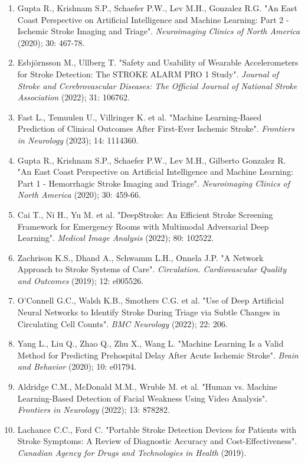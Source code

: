 {{\begin{enumerate}
    \item Gupta R., Krishnam S.P., Schaefer P.W., Lev M.H., Gonzalez R.G. "An East Coast Perspective on Artificial Intelligence and Machine Learning: Part 2 - Ischemic Stroke Imaging and Triage". \textit{Neuroimaging Clinics of North America} (2020); 30: 467-78.
    \item Esbjörnsson M., Ullberg T. "Safety and Usability of Wearable Accelerometers for Stroke Detection: The STROKE ALARM PRO 1 Study". \textit{Journal of Stroke and Cerebrovascular Diseases: The Official Journal of National Stroke Association} (2022); 31: 106762.
    \item Fast L., Temuulen U., Villringer K. et al. "Machine Learning-Based Prediction of Clinical Outcomes After First-Ever Ischemic Stroke". \textit{Frontiers in Neurology} (2023); 14: 1114360.
    \item Gupta R., Krishnam S.P., Schaefer P.W., Lev M.H., Gilberto Gonzalez R. "An East Coast Perspective on Artificial Intelligence and Machine Learning: Part 1 - Hemorrhagic Stroke Imaging and Triage". \textit{Neuroimaging Clinics of North America} (2020); 30: 459-66.
    \item Cai T., Ni H., Yu M. et al. "DeepStroke: An Efficient Stroke Screening Framework for Emergency Rooms with Multimodal Adversarial Deep Learning". \textit{Medical Image Analysis} (2022); 80: 102522.
    \item Zachrison K.S., Dhand A., Schwamm L.H., Onnela J.P. "A Network Approach to Stroke Systems of Care". \textit{Circulation. Cardiovascular Quality and Outcomes} (2019); 12: e005526.
    \item O'Connell G.C., Walsh K.B., Smothers C.G. et al. "Use of Deep Artificial Neural Networks to Identify Stroke During Triage via Subtle Changes in Circulating Cell Counts". \textit{BMC Neurology} (2022); 22: 206.
    \item Yang L., Liu Q., Zhao Q., Zhu X., Wang L. "Machine Learning Is a Valid Method for Predicting Prehospital Delay After Acute Ischemic Stroke". \textit{Brain and Behavior} (2020); 10: e01794.
    \item Aldridge C.M., McDonald M.M., Wruble M. et al. "Human vs. Machine Learning-Based Detection of Facial Weakness Using Video Analysis". \textit{Frontiers in Neurology} (2022); 13: 878282.
    \item Lachance C.C., Ford C. "Portable Stroke Detection Devices for Patients with Stroke Symptoms: A Review of Diagnostic Accuracy and Cost-Effectiveness". \textit{Canadian Agency for Drugs and Technologies in Health} (2019).

\end{enumerate}}}
